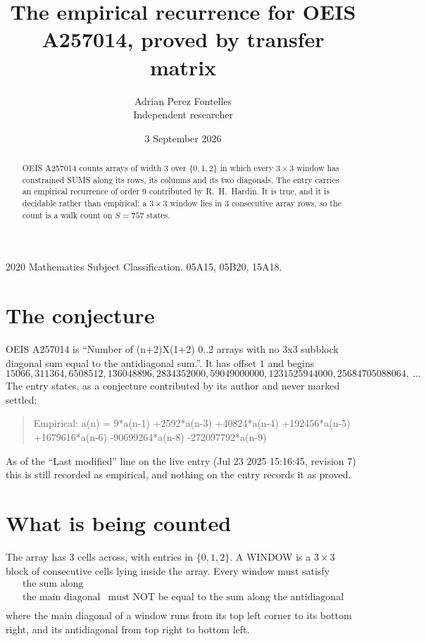 \documentclass[11pt,a4paper]{article}
\title{The empirical recurrence for OEIS A257014, proved by transfer matrix}
\author{Adrian Perez Fontelles\\ \small Independent researcher}
\date{3 September 2026}
\theoremstyle{plain}
\theoremstyle{definition}
\begin{document}
\maketitle

\begin{abstract}
OEIS A257014 counts arrays of width $3$ over $\{0,1,2\}$ in which every $3\times3$ window has
constrained SUMS along its rows, its columns and its two diagonals. The entry carries an
empirical recurrence of order $9$ contributed by R.~H.~Hardin. It is true, and it is
decidable rather than empirical: a $3\times3$ window lies in $3$ consecutive array rows,
so the count is a walk count on $S=757$ states.
\end{abstract}

\noindent\small 2020 Mathematics Subject Classification. 05A15, 05B20, 15A18.\normalsize

\section{The conjecture}

OEIS A257014 is ``Number of (n+2)X(1+2) 0..2 arrays with no 3x3 subblock diagonal sum equal to the antidiagonal sum.''. It has offset $1$ and begins
\[
15066, 311364, 6508512, 136048896, 2834352000, 59049000000, 1231525944000, 25684705088064,\ \dots
\]
The entry states, as a conjecture contributed by its author and never marked settled:
\begin{quote}
Empirical: a(n) = 9*a(n-1) +2592*a(n-3) +40824*a(n-4) +192456*a(n-5) +1679616*a(n-6) -90699264*a(n-8) -272097792*a(n-9)
\end{quote}
As of the ``Last modified'' line on the live entry (Jul 23 2025 15:16:45, revision 7) this is still
recorded as empirical, and nothing on the entry records it as proved.

\section{What is being counted}

The array has $3$ cells across, with entries in $\{0,1,2\}$. A WINDOW is a $3\times3$ block
of consecutive cells lying inside the array. Every window must satisfy
\[
\begin{array}{ll}
\text{the sum along} & \text{} \\[2pt]
\text{the main diagonal} & \text{must NOT be equal to the sum along the antidiagonal} \\
\end{array}
\]
where the main diagonal of a window runs from its top left corner to its bottom right, and its
antidiagonal from top right to bottom left.
\end{document}
